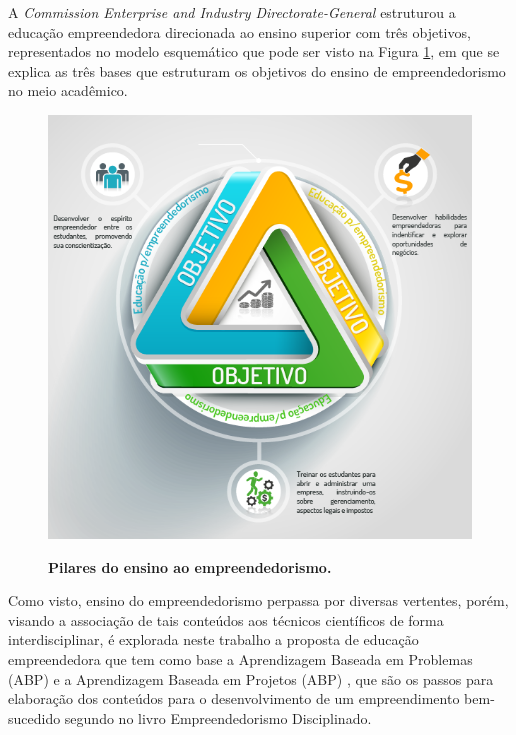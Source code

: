 A \textit{Commission Enterprise and Industry Directorate-General} \cite{european_commission_best_2008} estruturou a educação empreendedora direcionada ao ensino superior com três objetivos, representados no modelo esquemático que pode ser visto na Figura \ref{figura_3}, em que se explica as três bases que estruturam os objetivos do ensino de empreendedorismo no meio acadêmico. 

\begin{figure}[H]
\centering
\caption{\textbf{Pilares do ensino ao empreendedorismo.}}
\includegraphics[scale=0.5]{Imagens/objetivos_educacao_empreendedora.png}
\label{figura_3}
\end{figure}

Como visto, ensino do empreendedorismo perpassa por diversas vertentes, porém, visando a associação de tais conteúdos aos técnicos científicos de forma interdisciplinar, é explorada neste trabalho a proposta de educação empreendedora que tem como base a Aprendizagem Baseada em Problemas (ABP) e a Aprendizagem Baseada em Projetos (ABP) \cite{bender_aprendizagem_2015}, que são os passos para elaboração dos conteúdos para o desenvolvimento de um empreendimento bem-sucedido segundo \cite{aulet_empreendedorismo_2019} no livro Empreendedorismo Disciplinado. 

